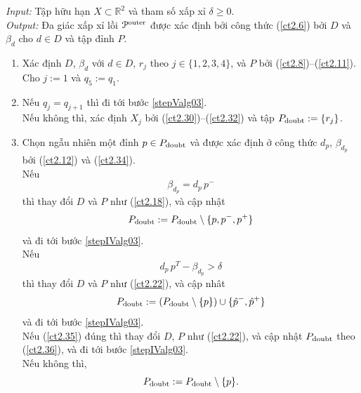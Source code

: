 \documentclass[12pt,a4paper,openany,oneside]{report}
\def\R{\mathbb{R}}
\begin{document}
\begin{algorithm}\label{alg03}  \rm 
	\caption{}  \label{al-blduoi2}
	\emph{Input:}  Tập hữu hạn $X \subset \R^2$ và tham số xấp xỉ  $\delta \geq 0$. \\
	\emph{Output:} Đa giác xấp xỉ lồi ${\cal P}^{\rm outer}$ được xác định bởi công thức (\ref{ct2.6}) bởi $D$ và $\beta_d$ cho $d \in D$ và tập đỉnh $P$.
	\begin{enumerate}
		\item\label{stepIalg03} 
		Xác định $D$, $\beta_d$ với $d \in D$, $r_j$ theo $j \in \{1, 2, 3, 4\}$, và $P$ bởi (\ref{ct2.8})--(\ref{ct2.11}). \\
		Cho $j := 1$ và $q_5 := q_1$. 
		
		\item\label{stepIIalg03} 
		Nếu $q_j = q_{j+1}$ thì đi tới bước \ref{stepValg03}.\\
		Nếu không thì, xác định $X_j$ bởi (\ref{ct2.30})--(\ref{ct2.32}) và tập $P_{\rm doubt} := \{r_j\}$.
		
		\item\label{stepIIIalg03} 
		Chọn ngẫu nhiên một đỉnh $p \in P_{\rm doubt}$ và được xác định ở công thức $d_p$, $\beta_{d_p}$ bởi (\ref{ct2.12}) và (\ref{ct2.34}). \\
	Nếu
		\begin{equation*}%
			\beta_{d_p} = d_p\, p^-
		\end{equation*}
		thì thay đổi $D$ và $P$ như (\ref{ct2.18}), và cập nhật
		\begin{equation*}\label{ct2.36}
			P_{\rm doubt} := P_{\rm doubt} \setminus \{p, p^-, p^+\}
		\end{equation*}
		và đi tới bước \ref{stepIValg03}.\\
		Nếu 
		\begin{equation*}%
			d_{p}\, p^T - \beta_{d_{p}} > \delta
		\end{equation*}
		thì thay đổi $D$ và $P$ như (\ref{ct2.22}), và cập nhât 
		\begin{equation}\label{newPdoubt4+}
			P_{\rm doubt} := (P_{\rm doubt} \setminus \{p\}) \cup \{\hat p^-, \hat p^+\}
		\end{equation}
		và đi tới bước \ref{stepIValg03}.\\
		Nếu (\ref{ct2.35}) đúng thì thay đổi $D$, $P$ như (\ref{ct2.22}), và cập nhật $P_{\rm doubt}$ theo (\ref{ct2.36}), và đi tới bước \ref{stepIValg03}.\\
		Nếu không thì,
		\begin{equation*}%
			P_{\rm doubt} := P_{\rm doubt} \setminus \{p\}.
		\end{equation*}
		

\end{enumerate}
\end{algorithm}
\end{document}
